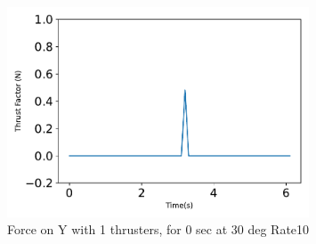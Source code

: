 \begin{figure}[htbp]\centerline{\includegraphics[width=0.8\textwidth]{AutoTeX/Force_1Thrusters_0s_30deg_Loc2_Rate10}}\caption{Force on Y with 1 thrusters, for 0 sec at 30 deg Rate10}\label{fig:Force_1Thrusters_0s_30deg_Loc2_Rate10}\end{figure}